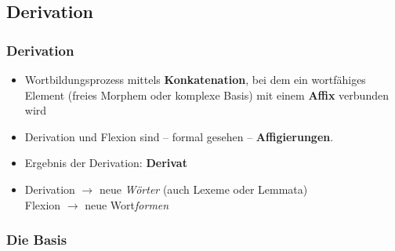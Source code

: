\subsection{Derivation}


\begin{frame}
\frametitle{Derivation}


	\begin{itemize}
		\item Wortbildungsprozess mittels \textbf{Konkatenation}, bei dem ein wortfähiges Element (freies Morphem oder komplexe Basis) mit einem \textbf{Affix} verbunden wird

		\item Derivation und Flexion sind -- formal gesehen -- \textbf{Affigierungen}.
		
		\item Ergebnis der Derivation: \textbf{Derivat}

		\item 	Derivation $\rightarrow$ neue \emph{Wörter} (auch Lexeme oder Lemmata)\\
		Flexion $\rightarrow$ neue Wort\emph{formen}
	
	\end{itemize}
	
\end{frame}



\subsubsection{Die Basis}


